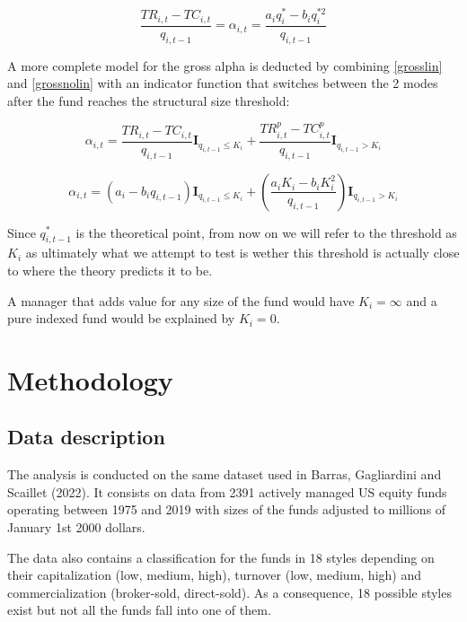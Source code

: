 \documentclass[12pt]{article}
\let\orgautoref\autoref
\renewcommand{\autoref}[1]{\def\equationautorefname{Eq.}\orgautoref{#1}}
\begin{document}
\begin{equation}
    \frac{TR_{i,t}-TC_{i,t}}{q_{i,t-1}}= \alpha_{i,t}=\frac{a_iq_{i}^{*}-b_iq_{i}^{*2}}{q_{i,t-1}}\label{grossnolin}
\end{equation}


A more complete model for the gross alpha is deducted by combining \autoref{grosslin} and \autoref{grossnolin} with an indicator function that switches between the 2 modes after the fund reaches the structural size threshold:

\begin{equation}
    \alpha_{i,t}=\frac{TR_{i,t}-TC_{i,t}}{q_{i,t-1}}\textbf{I}_{q_{i,t-1}\leq K_i} + \frac{TR^p_{i,t}-TC^p_{i,t}}{q_{i,t-1}}\textbf{I}_{q_{i,t-1}>K_i}
\end{equation}

\begin{equation}
    \alpha_{i,t}=(a_i-b_iq_{i,t-1})\textbf{I}_{q_{i,t-1}\leq K_i}+ \left( \frac{a_iK_i-b_iK_i^2}{q_{i,t-1}} \right) \textbf{I}_{q_{i,t-1}>K_i}\label{model}
\end{equation}

Since $q_{i,t-1}^{*}$ is the theoretical point, from now on we will refer to the threshold as $K_i$ as ultimately what we attempt to test is wether this threshold is actually close to where the theory predicts it to be.  

\par A manager that adds value for any size of the fund would have $K_i=\infty$ and a pure indexed fund would be explained by $K_i=0$.


\section{Methodology}

\subsection{Data description}
The analysis is conducted on the same dataset used in Barras, Gagliardini and Scaillet (2022)\cite{BarrasGagliardiniScaillet2021}. It consists on data from 2391 actively managed US equity funds operating between 1975 and 2019 with sizes of the funds adjusted to millions of January 1st 2000 dollars.
\par The data also contains a classification for the funds in 18 styles depending on their capitalization (low, medium, high), turnover (low, medium, high) and commercialization (broker-sold, direct-sold). As a consequence, 18 possible styles exist but not all the funds fall into one of them.
\end{document}
